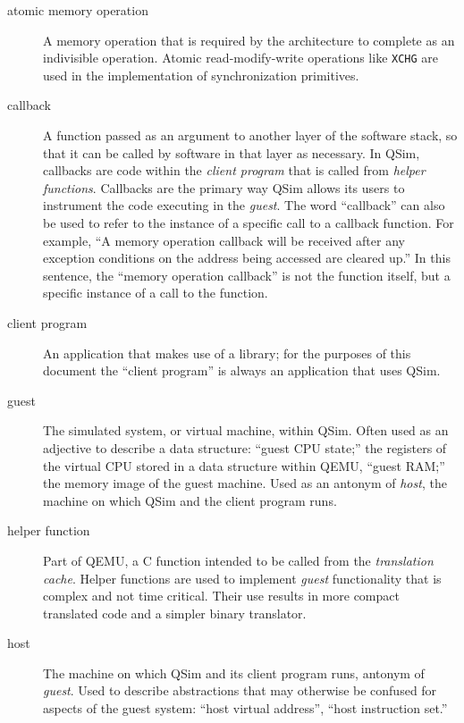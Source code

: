 \documentclass[letterpaper, 10pt]{book}
\begin{document}
\begin{description}
\item[atomic memory operation]
A memory operation that is required by the architecture to complete as an
indivisible operation. Atomic read-modify-write operations like \texttt{XCHG} 
are used in the implementation of synchronization primitives.

\item[callback]
A function passed as an argument to another layer of the software stack, so
that it can be called by software in that layer as necessary. In QSim, 
callbacks are code within the \emph{client program} that is called from
\emph{helper functions}. Callbacks are the primary way QSim allows its users to
instrument the code executing in the \emph{guest}. The word ``callback'' can
also be used to refer to the instance of a specific call to a callback
function. For example, ``A memory operation callback will be received after any
exception conditions on the address being accessed are cleared up.'' In this 
sentence, the ``memory operation callback'' is not the function itself, but a 
specific instance of a call to the function.

\item[client program]
An application that makes use of a library; for the purposes of this document
the ``client program'' is always an application that uses QSim.

\item[guest]
The simulated system, or virtual machine, within QSim. Often used as an
adjective to describe a data structure: ``guest CPU state;'' the registers of 
the virtual CPU stored in a data structure within QEMU, ``guest RAM;'' the 
memory image of the guest machine. Used as an antonym of \emph{host}, the
machine on which QSim and the client program runs.

\item[helper function]
Part of QEMU, a C function intended to be called from the 
\emph{translation cache}. Helper functions are used to implement \emph{guest}
functionality that is complex and not time critical. Their use results in more
compact translated code and a simpler binary translator.

\item[host]
The machine on which QSim and its client program runs, antonym of 
\emph{guest}. Used to describe abstractions that may otherwise be confused for
aspects of the guest system: ``host virtual address'',
``host instruction set.''


\end{description}
\end{document}

